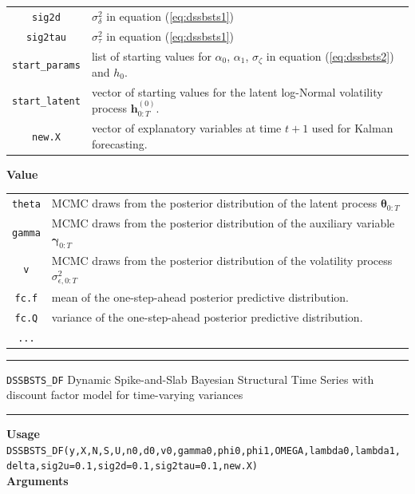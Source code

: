 \documentclass[
  12pt,
]{book}
\theoremstyle{break}
\theoremstyle{nonumberplain}
\begin{document}
\begin{small}
\begin{longtable}{ c l }
\texttt{sig2d} & $\sigma^{2}_{\delta}$ in equation (\ref{eq:dssbsts1})\\
\texttt{sig2tau} & $\sigma^{2}_{\tau}$ in equation (\ref{eq:dssbsts1})\\
\texttt{start\_params} &  list of starting values for $\alpha_0$, $\alpha_1$, $\sigma_\zeta$ in equation (\ref{eq:dssbsts2}) and $h_0$.\\
\texttt{start\_latent} &  vector of starting values for the latent log-Normal volatility process $\boldsymbol{h}^{(0)}_{0:T}$.\\
\texttt{new.X} &  vector of explanatory variables at time $t+1$ used for Kalman forecasting.
\end{longtable}
\end{small}

\textbf{Value}

\begin{small}
\begin{longtable}{ c l }
\texttt{theta} & MCMC draws from the posterior distribution of the latent process $\boldsymbol{\theta}_{0:T}$  \\
\texttt{gamma} &  MCMC draws from the posterior distribution of the auxiliary variable $\boldsymbol{\gamma}_{0:T}$\\
\texttt{v} &  MCMC draws from the posterior distribution of the volatility process $\sigma^{2}_{\epsilon,0:T}$ \\
\texttt{fc.f} & mean of the one-step-ahead posterior predictive distribution.\\
\texttt{fc.Q} & variance of the one-step-ahead posterior predictive distribution.\\
\texttt{...} & 
\end{longtable}
\end{small}
\hrule
\vspace{1em}

\texttt{DSSBSTS\_DF} Dynamic Spike-and-Slab Bayesian Structural Time
Series with discount factor model for time-varying variances
\vspace{1em}

\hrule
\vspace{1em}

\textbf{Usage}\\
\texttt{DSSBSTS\_DF(y,X,N,S,U,n0,d0,v0,gamma0,phi0,phi1,OMEGA,lambda0,lambda1,\\ delta,sig2u=0.1,sig2d=0.1,sig2tau=0.1,new.X)}\\
\textbf{Arguments}\\
\end{document}
